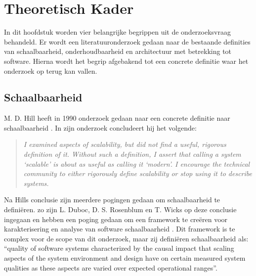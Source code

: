 \chapter{Theoretisch Kader}
\label{Chapter2}

In dit hoofdstuk worden vier belangrijke begrippen uit de onderzoeksvraag behandeld. Er wordt een literatuuronderzoek gedaan naar de bestaande definities van schaalbaarheid, onderhoudbaarheid en architectuur met betrekking tot software. Hierna wordt het begrip afgebakend tot een concrete definitie waar het onderzoek op terug kan vallen.

\section{Schaalbaarheid} \label{TheoretischSchaalbaarheid}

M. D. Hill heeft in 1990 onderzoek gedaan naar een concrete definitie naar schaalbaarheid \parencite{WhatIsScalability}. In zijn onderzoek concludeert hij het volgende:
\begin{quote}
	\textit{
		I examined aspects of scalability, but did not find a useful, rigorous definition of it. Without such a definition, I assert that calling a system ‘scalable’ is about as useful as calling it ‘modern’. I encourage the technical community to either rigorously define scalability or stop using it to describe systems.
	}
\end{quote}
Na Hills conclusie zijn meerdere pogingen gedaan om schaalbaarheid te definiëren. zo zijn L. Duboc, D. S. Rosenblum en T. Wicks op deze conclusie ingegaan en hebben een poging gedaan om een framework te creëren voor karakterisering en analyse van software schaalbaarheid \parencite{ScalabilityFramework}. Dit framework is te complex voor de scope van dit onderzoek, maar zij definiëren schaalbaarheid als: \enquote{quality of software systems characterized by the causal impact that scaling aspects of the system environment and design have on certain measured system qualities as these aspects are varied over expected operational ranges}.


